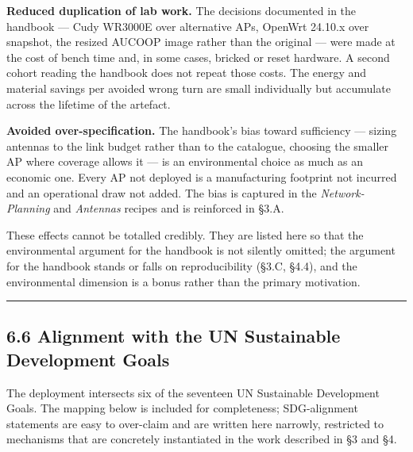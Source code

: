 \textbf{Reduced duplication of lab work.} The decisions documented in
the handbook --- Cudy WR3000E over alternative APs, OpenWrt 24.10.x over
snapshot, the resized AUCOOP image rather than the original --- were
made at the cost of bench time and, in some cases, bricked or reset
hardware. A second cohort reading the handbook does not repeat those
costs. The energy and material savings per avoided wrong turn are small
individually but accumulate across the lifetime of the artefact.

\textbf{Avoided over-specification.} The handbook's bias toward
sufficiency --- sizing antennas to the link budget rather than to the
catalogue, choosing the smaller AP where coverage allows it --- is an
environmental choice as much as an economic one. Every AP not deployed
is a manufacturing footprint not incurred and an operational draw not
added. The bias is captured in the \emph{Network-Planning} and
\emph{Antennas} recipes and is reinforced in §3.A.

These effects cannot be totalled credibly. They are listed here so that
the environmental argument for the handbook is not silently omitted; the
argument for the handbook stands or falls on reproducibility (§3.C,
§4.4), and the environmental dimension is a bonus rather than the
primary motivation.

\begin{center}\rule{0.5\linewidth}{0.5pt}\end{center}

\hypertarget{alignment-with-the-un-sustainable-development-goals}{%
\subsection{6.6 Alignment with the UN Sustainable Development
Goals}\label{alignment-with-the-un-sustainable-development-goals}}

The deployment intersects six of the seventeen UN Sustainable
Development Goals. The mapping below is included for completeness;
SDG-alignment statements are easy to over-claim and are written here
narrowly, restricted to mechanisms that are concretely instantiated in
the work described in §3 and §4.

